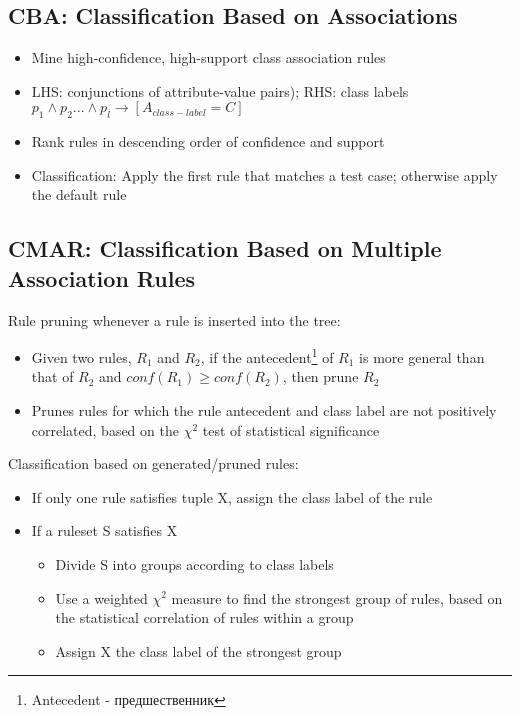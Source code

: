 \subsection{CBA: Classification Based on Associations}
\begin{itemize}
\item Mine high-confidence, high-support class association rules
\item LHS: conjunctions of attribute-value pairs); RHS: class labels\\
$p_1 \wedge p_2 ... \wedge p_l \to \left[A_{class-label} = C\right]$
\item Rank rules in descending order of confidence and support
\item Classification: Apply the first rule that matches a test case; otherwise apply the default rule
\end{itemize}

\subsection{CMAR: Classification Based on Multiple Association Rules}
Rule pruning whenever a rule is inserted into the tree:
\begin{itemize}
\item Given two rules, $R_1$ and $R_2$, if the antecedent\footnote{Antecedent - предшественник} of $R_1$ is more general than that of $R_2$ and $conf(R_1) \geqslant conf(R_2)$, then prune $R_2$
\item Prunes rules for which the rule antecedent and class label are not positively correlated, based on the $\chi^2$ test of statistical significance
\end{itemize}

Classification based on generated/pruned rules:
\begin{itemize}
\item If only one rule satisfies tuple X, assign the class label of the rule \item If a ruleset S satisfies X
\begin{itemize}
\item Divide S into groups according to class labels
\item Use a weighted $\chi^2$ measure to find the strongest group of rules, based on the statistical correlation of rules within a group 
\item Assign X the class label of the strongest group
\end{itemize}
\end{itemize}

